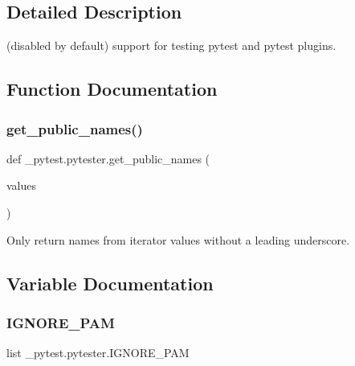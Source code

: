 \subsection{Detailed Description}
\begin{DoxyVerb}(disabled by default) support for testing pytest and pytest plugins.\end{DoxyVerb}
 

\subsection{Function Documentation}
\mbox{\label{namespace__pytest_1_1pytester_a409b7904819230c9816a7d70418a49b1}} 
\subsubsection{\texorpdfstring{get\+\_\+public\+\_\+names()}{get\_public\_names()}}
{\footnotesize\ttfamily def \+\_\+pytest.\+pytester.\+get\+\_\+public\+\_\+names (\begin{DoxyParamCaption}\item[{}]{values }\end{DoxyParamCaption})}

\begin{DoxyVerb}Only return names from iterator values without a leading underscore.\end{DoxyVerb}
 

\subsection{Variable Documentation}
\mbox{\label{namespace__pytest_1_1pytester_a69c958c6c5d66f0df3f8b6445f84328c}} 
\subsubsection{\texorpdfstring{I\+G\+N\+O\+R\+E\+\_\+\+P\+AM}{IGNORE\_PAM}}
{\footnotesize\ttfamily list \+\_\+pytest.\+pytester.\+I\+G\+N\+O\+R\+E\+\_\+\+P\+AM}


